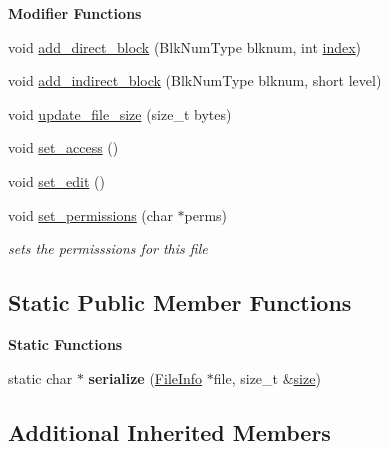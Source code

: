 \begin{Indent}\textbf{ Modifier Functions}\par
\begin{DoxyCompactItemize}
\item 
void \mbox{\hyperlink{classFileInfo_a1537d2ac2b5c170d144911c8337c81bc}{add\+\_\+direct\+\_\+block}} (Blk\+Num\+Type blknum, int \mbox{\hyperlink{structindex}{index}})
\item 
void \mbox{\hyperlink{classFileInfo_a074956f43b5a6900205a541dbeaeb8c5}{add\+\_\+indirect\+\_\+block}} (Blk\+Num\+Type blknum, short level)
\item 
void \mbox{\hyperlink{classFileInfo_a3c548a8dfcb6530bfef7551ac24ca473}{update\+\_\+file\+\_\+size}} (size\+\_\+t bytes)
\item 
void \mbox{\hyperlink{classFileInfo_aacaeadeeb41726f8cbea0b7cb1ff6a22}{set\+\_\+access}} ()
\item 
void \mbox{\hyperlink{classFileInfo_a05eb10c6804660ecd47e556c27ecd019}{set\+\_\+edit}} ()
\item 
void \mbox{\hyperlink{classFileInfo_a377208012195dba0b24723837f6db39f}{set\+\_\+permissions}} (char $\ast$perms)
\begin{DoxyCompactList}\small\item\em sets the permisssions for this file \end{DoxyCompactList}\end{DoxyCompactItemize}
\end{Indent}
\subsection*{Static Public Member Functions}
\begin{Indent}\textbf{ Static Functions}\par
\begin{DoxyCompactItemize}
\item 
\mbox{\label{classFileInfo_a21307da38fc08eb6bed27e7210c2de2a}} 
static char $\ast$ {\bfseries serialize} (\mbox{\hyperlink{classFileInfo}{File\+Info}} $\ast$file, size\+\_\+t \&\mbox{\hyperlink{classTreeObject_a2a3dffe29aba8965c7977312c3721b50}{size}})
\end{DoxyCompactItemize}
\end{Indent}
\subsection*{Additional Inherited Members}


